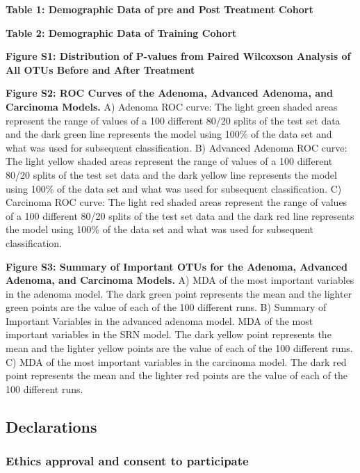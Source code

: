 \documentclass[12pt,]{article}
\begin{document}
\newpage

\textbf{Table 1: Demographic Data of pre and Post Treatment Cohort}

\textbf{Table 2: Demographic Data of Training Cohort}

\newpage

\textbf{Figure S1: Distribution of P-values from Paired Wilcoxson
Analysis of All OTUs Before and After Treatment}

\textbf{Figure S2: ROC Curves of the Adenoma, Advanced Adenoma, and
Carcinoma Models.} A) Adenoma ROC curve: The light green shaded areas
represent the range of values of a 100 different 80/20 splits of the
test set data and the dark green line represents the model using 100\%
of the data set and what was used for subsequent classification. B)
Advanced Adenoma ROC curve: The light yellow shaded areas represent the
range of values of a 100 different 80/20 splits of the test set data and
the dark yellow line represents the model using 100\% of the data set
and what was used for subsequent classification. C) Carcinoma ROC curve:
The light red shaded areas represent the range of values of a 100
different 80/20 splits of the test set data and the dark red line
represents the model using 100\% of the data set and what was used for
subsequent classification.

\textbf{Figure S3: Summary of Important OTUs for the Adenoma, Advanced
Adenoma, and Carcinoma Models.} A) MDA of the most important variables
in the adenoma model. The dark green point represents the mean and the
lighter green points are the value of each of the 100 different runs. B)
Summary of Important Variables in the advanced adenoma model. MDA of the
most important variables in the SRN model. The dark yellow point
represents the mean and the lighter yellow points are the value of each
of the 100 different runs. C) MDA of the most important variables in the
carcinoma model. The dark red point represents the mean and the lighter
red points are the value of each of the 100 different runs.

\newpage

\subsection{Declarations}\label{declarations}

\subsubsection{Ethics approval and consent to
participate}\label{ethics-approval-and-consent-to-participate}
\end{document}
